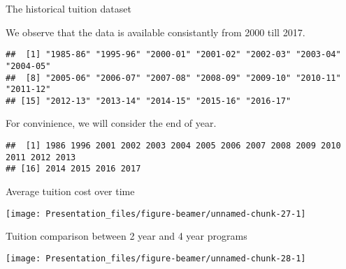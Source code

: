 \documentclass[
  ignorenonframetext,
]{beamer}
\begin{document}
\begin{frame}[fragile]{The historical tuition dataset}
\protect\hypertarget{the-historical-tuition-dataset-1}{}

\begin{block}{We observe that the data is available consistantly from
2000 till 2017.}

\begin{verbatim}
##  [1] "1985-86" "1995-96" "2000-01" "2001-02" "2002-03" "2003-04" "2004-05"
##  [8] "2005-06" "2006-07" "2007-08" "2008-09" "2009-10" "2010-11" "2011-12"
## [15] "2012-13" "2013-14" "2014-15" "2015-16" "2016-17"
\end{verbatim}

\end{block}

\begin{block}{For convinience, we will consider the end of year.}

\begin{verbatim}
##  [1] 1986 1996 2001 2002 2003 2004 2005 2006 2007 2008 2009 2010 2011 2012 2013
## [16] 2014 2015 2016 2017
\end{verbatim}

\end{block}

\end{frame}

\begin{frame}{Average tuition cost over time}
\protect\hypertarget{average-tuition-cost-over-time}{}

\begin{center}\texttt{[image: Presentation\_files/figure-beamer/unnamed-chunk-27-1]} \end{center}

\end{frame}

\begin{frame}{Tuition comparison between 2 year and 4 year programs}
\protect\hypertarget{tuition-comparison-between-2-year-and-4-year-programs}{}

\begin{center}\texttt{[image: Presentation\_files/figure-beamer/unnamed-chunk-28-1]} \end{center}

\end{frame}
\end{document}

